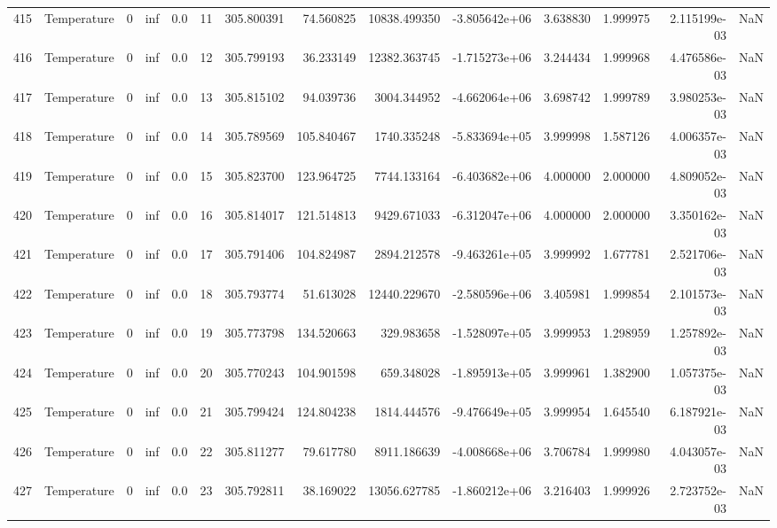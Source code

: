 \begin{tabular}{llrrrrrrrrrrrr}
415 &  Temperature &       0 &  inf &  0.0 &   11 &  305.800391 &    74.560825 &   10838.499350 & -3.805642e+06 &  3.638830 &  1.999975 &  2.115199e-03 &      NaN \\
416 &  Temperature &       0 &  inf &  0.0 &   12 &  305.799193 &    36.233149 &   12382.363745 & -1.715273e+06 &  3.244434 &  1.999968 &  4.476586e-03 &      NaN \\
417 &  Temperature &       0 &  inf &  0.0 &   13 &  305.815102 &    94.039736 &    3004.344952 & -4.662064e+06 &  3.698742 &  1.999789 &  3.980253e-03 &      NaN \\
418 &  Temperature &       0 &  inf &  0.0 &   14 &  305.789569 &   105.840467 &    1740.335248 & -5.833694e+05 &  3.999998 &  1.587126 &  4.006357e-03 &      NaN \\
419 &  Temperature &       0 &  inf &  0.0 &   15 &  305.823700 &   123.964725 &    7744.133164 & -6.403682e+06 &  4.000000 &  2.000000 &  4.809052e-03 &      NaN \\
420 &  Temperature &       0 &  inf &  0.0 &   16 &  305.814017 &   121.514813 &    9429.671033 & -6.312047e+06 &  4.000000 &  2.000000 &  3.350162e-03 &      NaN \\
421 &  Temperature &       0 &  inf &  0.0 &   17 &  305.791406 &   104.824987 &    2894.212578 & -9.463261e+05 &  3.999992 &  1.677781 &  2.521706e-03 &      NaN \\
422 &  Temperature &       0 &  inf &  0.0 &   18 &  305.793774 &    51.613028 &   12440.229670 & -2.580596e+06 &  3.405981 &  1.999854 &  2.101573e-03 &      NaN \\
423 &  Temperature &       0 &  inf &  0.0 &   19 &  305.773798 &   134.520663 &     329.983658 & -1.528097e+05 &  3.999953 &  1.298959 &  1.257892e-03 &      NaN \\
424 &  Temperature &       0 &  inf &  0.0 &   20 &  305.770243 &   104.901598 &     659.348028 & -1.895913e+05 &  3.999961 &  1.382900 &  1.057375e-03 &      NaN \\
425 &  Temperature &       0 &  inf &  0.0 &   21 &  305.799424 &   124.804238 &    1814.444576 & -9.476649e+05 &  3.999954 &  1.645540 &  6.187921e-03 &      NaN \\
426 &  Temperature &       0 &  inf &  0.0 &   22 &  305.811277 &    79.617780 &    8911.186639 & -4.008668e+06 &  3.706784 &  1.999980 &  4.043057e-03 &      NaN \\
427 &  Temperature &       0 &  inf &  0.0 &   23 &  305.792811 &    38.169022 &   13056.627785 & -1.860212e+06 &  3.216403 &  1.999926 &  2.723752e-03 &      NaN \\

\end{tabular}
